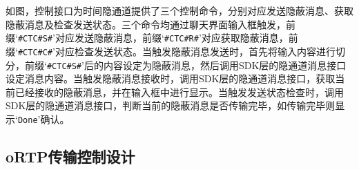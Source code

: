 
如图，控制接口为时间隐通道提供了三个控制命令，分别对应发送隐蔽消息、获取隐蔽消息及检查发送状态。三个命令均通过聊天界面输入框触发，前缀‘\texttt{\#CTC\#S\#}’对应发送隐蔽消息，前缀‘\texttt{\#CTC\#R\#}’对应获取隐蔽消息，前缀‘\texttt{\#CTC\#C\#}’对应检查发送状态。当触发隐蔽消息发送时，首先将输入内容进行切分，前缀‘\texttt{\#CTC\#S\#}’后的内容设定为隐蔽消息，然后调用SDK层的隐通道消息接口设定消息内容。当触发隐蔽消息接收时，调用SDK层的隐通道消息接口，获取当前已经接收的隐蔽消息，并在输入框中进行显示。当触发发送状态检查时，调用SDK层的隐通道消息接口，判断当前的隐蔽消息是否传输完毕，如传输完毕则显示‘\texttt{Done}’确认。

\subsection{oRTP传输控制设计}
\label{chap:linphone:designation:ortp}


